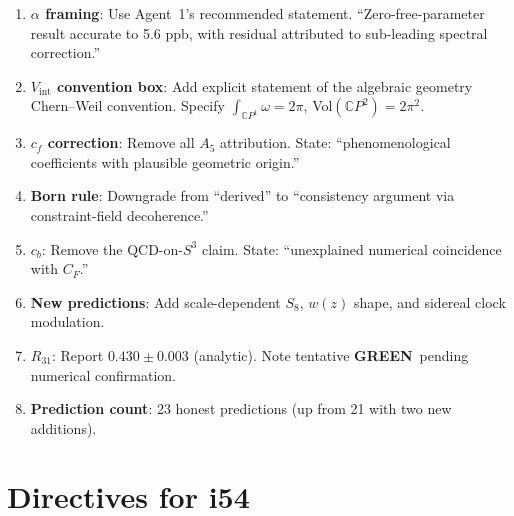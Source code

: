\documentclass[11pt,a4paper]{article}
\newcommand{\GREEN}{\textcolor{dfdgreen}{\textbf{GREEN}}}
\newcommand{\CP}{\mathbb{C}P}
\begin{document}
\begin{enumerate}
\item \textbf{$\alpha$ framing}: Use Agent~1's recommended statement. ``Zero-free-parameter result accurate to 5.6 ppb, with residual attributed to sub-leading spectral correction.''
\item \textbf{$V_{\mathrm{int}}$ convention box}: Add explicit statement of the algebraic geometry Chern--Weil convention. Specify $\int_{\CP^1}\omega = 2\pi$, Vol$(\CP^2) = 2\pi^2$.
\item \textbf{$c_f$ correction}: Remove all $A_5$ attribution. State: ``phenomenological coefficients with plausible geometric origin.''
\item \textbf{Born rule}: Downgrade from ``derived'' to ``consistency argument via constraint-field decoherence.''
\item \textbf{$c_b$}: Remove the QCD-on-$S^3$ claim. State: ``unexplained numerical coincidence with $C_F$.''
\item \textbf{New predictions}: Add scale-dependent $S_8$, $w(z)$ shape, and sidereal clock modulation.
\item \textbf{$R_{31}$}: Report $0.430 \pm 0.003$ (analytic). Note tentative \GREEN\ pending numerical confirmation.
\item \textbf{Prediction count}: 23 honest predictions (up from 21 with two new additions).
\end{enumerate}


\section{Directives for i54}
\label{sec:directives}
\end{document}
